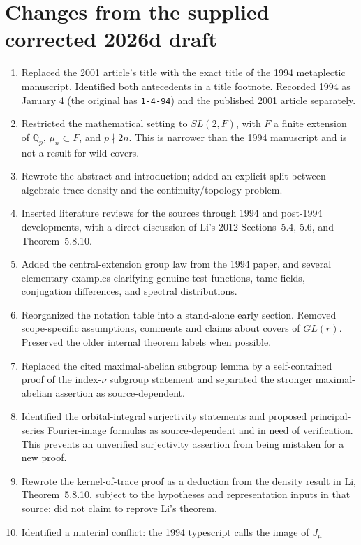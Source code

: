 \documentclass[12pt,letterpaper]{article}
\begin{document}
\section*{Changes from the supplied corrected 2026d draft}
\begin{enumerate}[leftmargin=*,itemsep=4pt]
\item Replaced the 2001 article's title with the exact title of the 1994
metaplectic manuscript.  Identified both antecedents in a title footnote.
Recorded 1994 as January 4 (the original has \texttt{1-4-94}) and the
published 2001 article separately.
\item Restricted the mathematical setting to $SL(2,F)$, with $F$ a finite
extension of $\mathbb Q_p$, $\mu_n\subset F$, and $p\nmid 2n$.
This is narrower than the 1994 manuscript and is not a result for wild covers.
\item Rewrote the abstract and introduction; added an explicit split
between algebraic trace density and the continuity/topology problem.
\item Inserted literature reviews for the sources through 1994 and
post-1994 developments, with a direct discussion of Li's 2012 Sections~5.4,
5.6, and Theorem~5.8.10.
\item Added the central-extension group law from the 1994 paper, and
several elementary examples clarifying genuine test functions, tame fields,
conjugation differences, and spectral distributions.
\item Reorganized the notation table into a stand-alone early section.
Removed scope-specific assumptions, comments and claims about covers of
$GL(r)$.  Preserved the older internal theorem labels when possible.
\item Replaced the cited maximal-abelian subgroup lemma by a self-contained
proof of the index-$\nu$ subgroup statement and separated the stronger
maximal-abelian assertion as source-dependent.
\item Identified the orbital-integral surjectivity statements and proposed
principal-series Fourier-image formulas as source-dependent and in need of
verification.  This prevents an unverified surjectivity assertion from
being mistaken for a new proof.
\item Rewrote the kernel-of-trace proof as a deduction from the density
result in Li, Theorem~5.8.10, subject to the hypotheses and representation
inputs in that source; did not claim to reprove Li's theorem.
\item Identified a material conflict: the 1994 typescript calls the image of $J_\mu$

\end{enumerate}
\end{document}
